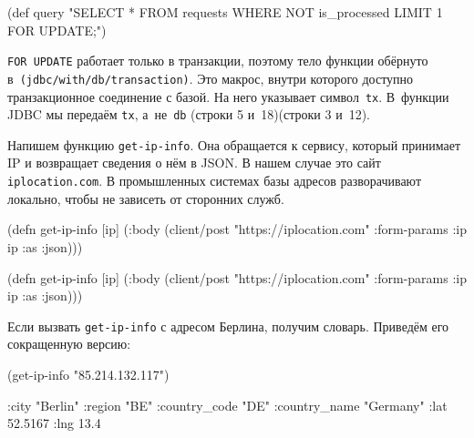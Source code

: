 \else

\begin{english}
  \begin{clojure}
(def query
  "SELECT * FROM requests WHERE NOT is_processed
   LIMIT 1 FOR UPDATE;")
  \end{clojure}
\end{english}

\fi

\verb|FOR UPDATE| работает только в транзакции, поэтому тело функции обёрнуто
в~\texttt{(jdbc/with\-/db\-/transaction)}. Это макрос, внутри которого доступно
транзакционное соединение с базой. На него указывает символ~\verb|tx|. В~функции
JDBC мы передаём \verb|tx|, а~не~\verb|db| \ifnarrow(строки 5 и~18)\else(строки 3 и~12)\fi.


Напишем функцию \verb|get-ip-info|. Она обращается к сервису, который принимает
IP и возвращает сведения о нём в JSON. В нашем случае это сайт
\verb|iplocation.com|. В промышленных системах базы адресов разворачивают
локально, чтобы не зависеть от сторонних служб.

\ifnarrow

\begin{english}
  \begin{clojure}
(defn get-ip-info [ip]
  (:body (client/post
           "https://iplocation.com"
           {:form-params {:ip ip}
            :as :json})))
  \end{clojure}
\end{english}

\else

\begin{english}
  \begin{clojure}
(defn get-ip-info [ip]
  (:body (client/post "https://iplocation.com"
                      {:form-params {:ip ip}
                       :as :json})))
  \end{clojure}
\end{english}

\fi

\noindent
Если вызвать \verb|get-ip-info| с адресом Берлина, получим словарь. Приведём его
сокращенную версию:

\begin{english}
  \begin{clojure}
(get-ip-info "85.214.132.117")

{:city "Berlin"
 :region "BE"
 :country_code "DE"
 :country_name "Germany"
 :lat 52.5167
 :lng 13.4}
  \end{clojure}
\end{english}

